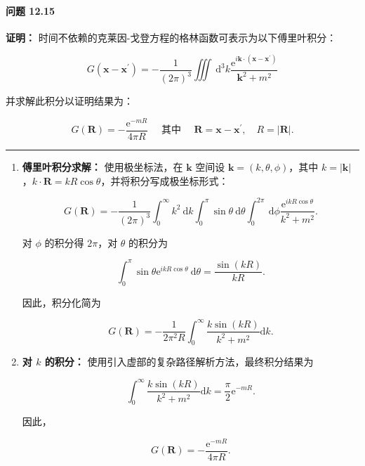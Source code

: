 \paragraph{问题 12.15}\label{ux95eeux9898-12.15}

\textbf{证明：}
时间不依赖的克莱因-戈登方程的格林函数可表示为以下傅里叶积分：

$$
G\left(\mathbf{x}-\mathbf{x}^{\prime}\right)=-\frac{1}{(2 \pi)^{3}} \iiint \mathrm{~d}^{3} k \frac{\mathrm{e}^{i \mathbf{k} \cdot\left(\mathbf{x}-\mathbf{x}^{\prime}\right)}}{\mathbf{k}^{2}+m^{2}}
$$

并求解此积分以证明结果为：

$$
G(\mathbf{R})=-\frac{\mathrm{e}^{-m R}}{4 \pi R} \quad \text { 其中 } \quad \mathbf{R}=\mathbf{x}-\mathbf{x}^{\prime}, \quad R=|\mathbf{R}|.
$$

\begin{center}\rule{0.5\linewidth}{0.5pt}\end{center}

\begin{enumerate}
\def\labelenumi{\arabic{enumi}.}
\item
  \textbf{傅里叶积分求解：} 使用极坐标法，在 $\mathbf{k}$ 空间设
  $\mathbf{k}=(k, \theta, \phi)$，其中
  $k=|\mathbf{k}|$，$k \cdot \mathbf{R}=k R \cos\theta$，并将积分写成极坐标形式：

  $$
  G(\mathbf{R})=-\frac{1}{(2 \pi)^{3}} \int_{0}^{\infty} k^{2} \mathrm{~d} k \int_{0}^{\pi} \sin \theta \mathrm{~d} \theta \int_{0}^{2 \pi} \mathrm{~d} \phi \frac{\mathrm{e}^{i k R \cos \theta}}{k^{2}+m^{2}}.
  $$

  对 $\phi$ 的积分得 $2 \pi$，对 $\theta$ 的积分为

  $$
  \int_{0}^{\pi} \sin \theta \mathrm{e}^{i k R \cos \theta} \mathrm{~d} \theta = \frac{\sin(k R)}{k R}.
  $$

  因此，积分化简为

  $$
  G(\mathbf{R})=-\frac{1}{2 \pi^{2} R} \int_{0}^{\infty} \frac{k \sin(k R)}{k^{2}+m^{2}} \mathrm{d} k.
  $$
\item
  \textbf{对 $k$ 的积分：}
  使用引入虚部的复杂路径解析方法，最终积分结果为

  $$
  \int_{0}^{\infty} \frac{k \sin(k R)}{k^{2}+m^{2}} \mathrm{d} k = \frac{\pi}{2} \mathrm{e}^{-m R}.
  $$

  因此，

  $$
  G(\mathbf{R})=-\frac{\mathrm{e}^{-m R}}{4 \pi R}.
  $$
\end{enumerate}

